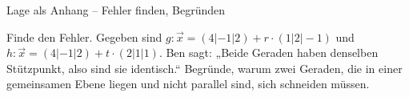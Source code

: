 \begin{aufgabe}{Lage als Anhang – Fehler finden, Begründen}
\begin{teile}
\teil Finde den Fehler. Gegeben sind $g\colon \vec x = (4 | -1 | 2) + r \cdot (1 | 2 | -1)$ und $h\colon \vec x = (4 | -1 | 2) + t \cdot (2 | 1 | 1)$. Ben sagt: „Beide Geraden haben denselben Stützpunkt, also sind sie identisch.“
\teil Begründe, warum zwei Geraden, die in einer gemeinsamen Ebene liegen und nicht parallel sind, sich schneiden müssen.
\end{teile}
\end{aufgabe}
